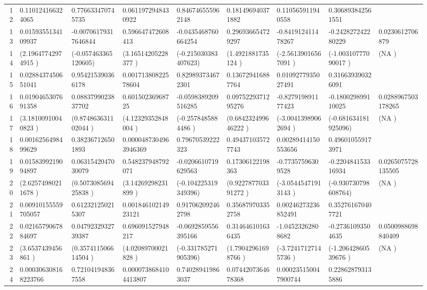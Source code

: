 \begin{table}[ht]
\begin{tabular}{rllllllll}
  12 & 0.110124166324065 & 0.776633470745735 & 0.0611972948430922 & 0.846746555962148 & 0.181496940371882 & 0.110565911940558 & 0.306893842561551 &  \\ 
  13 & 0.0159355134109937 & -0.00706179317646844 & 0.596647472608413 & -0.0435468760664254 & 0.296936654729297 & -0.841912411478267 & -0.242827242280229 & 0.0230612706879 \\ 
  14 & (2.19647742974915  ) & (-0.057463365120605) & (3.16514205228377  ) & (-0.215030383407623) & (1.4921881735124   ) & (-2.56139016567091 ) & (-1.00310777090017 ) & (NA                ) \\ 
  15 & 0.0288437450651041 & 0.954215390366178 & 0.00171380822578604 & 0.829893734672301 & 0.136729416887764 & 0.0109277935027491 & 0.316639390326091 &  \\ 
  16 & 0.0190465307691358 & 0.0883799023837702 & 0.60150236968725 & -0.0598389209516285 & 0.0975229371295276 & -0.827919891177423 & -0.180029899110025 & 0.0288967503178265 \\ 
  17 & (3.18100910040823  ) & (0.874863631102044 ) & (4.12329352848004  ) & (-0.2578485884486  ) & (0.684232499646222 ) & (-3.00413989062694 ) & (-0.681634181925096) & (NA                ) \\ 
  18 & 0.0016256498499629 & 0.382367126501893 & 0.0000487304963946369 & 0.79670539222323 & 0.494371035727743 & 0.00289414150553656 & 0.496010559173971 &  \\ 
  19 & 0.0158399219094897 & 0.0631542047030079 & 0.548237948792071 & -0.0206610719629563 & 0.17306122198363 & -0.77357596309528 & -0.220484153316934 & 0.0265075728135505 \\ 
  20 & (2.62574980211678  ) & (0.507308569425838 ) & (3.14269298231899  ) & (-0.104225319349396) & (0.922787703391272 ) & (-3.05445471913143 ) & (-0.930730798608764) & (NA                ) \\ 
  21 & 0.00910155559705057 & 0.612321250215307 & 0.00184610214923121 & 0.917062092462798 & 0.356879703352758 & 0.00246273236852491 & 0.352761670407721 &  \\ 
  22 & 0.0216579067884697 & 0.0479232932739387 & 0.696091527948217 & -0.0692859556395166 & 0.314646101636435 & -1.04523262808682 & -0.27361093504635 & 0.0500988698840409 \\ 
  23 & (3.6537439456861   ) & (0.357411506614504 ) & (4.02089700021828  ) & (-0.331785271905396) & (1.79042961698766  ) & (-3.72417127145736 ) & (-1.20642860539676 ) & (NA                ) \\ 
  24 & 0.000306308168223766 & 0.721041948367558 & 0.0000738684104413807 & 0.740289419863037 & 0.0744207364678368 & 0.000235150047900744 & 0.228628793135886 &  \\ 

\end{tabular}
\end{table}
